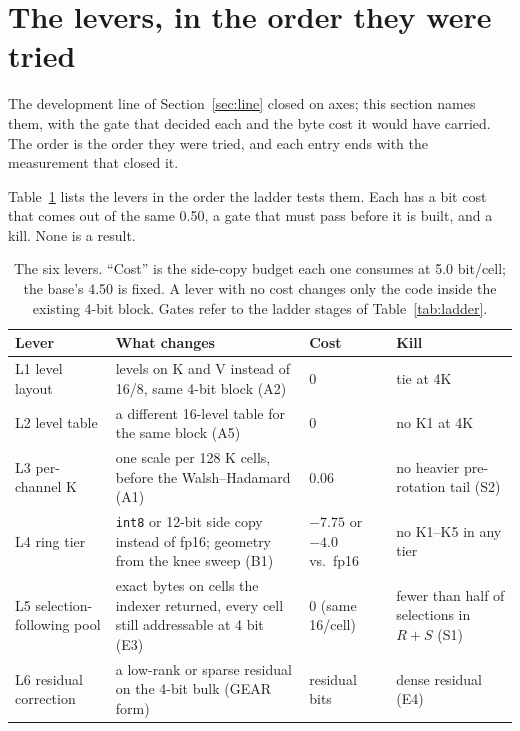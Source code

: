 \documentclass[10pt,twocolumn]{article}
\begin{document}
\section{The levers, in the order they were tried}\label{sec:levers}

The development line of Section~\ref{sec:line} closed on axes; this section names them, with the gate that
decided each and the byte cost it would have carried. The order is the order they were tried, and each entry
ends with the measurement that closed it.

Table~\ref{tab:levers} lists the levers in the order the ladder tests them. Each has a bit cost that comes out of the same 0.50, a gate that must pass before it is built, and a kill. None is a result.

\begin{table}[t]
\centering
\footnotesize
\caption{The six levers. ``Cost'' is the side-copy budget each one consumes at 5.0 bit/cell; the base's 4.50 is fixed. A lever with no cost changes only the code inside the existing 4-bit block. Gates refer to the ladder stages of Table~\ref{tab:ladder}.}
\label{tab:levers}
\begin{tabularx}{\textwidth}{@{}l>{\raggedright\arraybackslash}Xll@{}}
\toprule
Lever & What changes & Cost & Kill \\
\midrule
L1 level layout & 16 levels on K and V instead of 16/8, same 4-bit block (A2) & 0 & tie at 4K \\
L2 level table & a different 16-level table for the same block (A5) & 0 & no K1 at 4K \\
L3 per-channel K & one scale per 128 K cells, before the Walsh--Hadamard (A1) & 0.06 & no heavier pre-rotation tail (S2) \\
L4 ring tier & \texttt{int8} or 12-bit side copy instead of fp16; geometry from the knee sweep (B1) & $-7.75$ or $-4.0$ vs.\ fp16 & no K1--K5 in any tier \\
L5 selection-following pool & exact bytes on cells the indexer returned, every cell still addressable at 4 bit (E3) & 0 (same 16/cell) & fewer than half of selections in $R{+}S$ (S1) \\
L6 residual correction & a low-rank or sparse residual on the 4-bit bulk (GEAR form) & residual bits & dense residual (E4) \\
\bottomrule
\end{tabularx}
\end{table}
\end{document}
